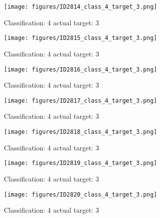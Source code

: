\begin{figure}[h!]
\begin{center}
\texttt{[image: figures/ID2814\_class\_4\_target\_3.png]}
\end{center}
\caption{ Classification: 4 actual target: 3}
\label{fig:ID2814_class_4_target_3}
\end{figure}
\begin{figure}[h!]
\begin{center}
\texttt{[image: figures/ID2815\_class\_4\_target\_3.png]}
\end{center}
\caption{ Classification: 4 actual target: 3}
\label{fig:ID2815_class_4_target_3}
\end{figure}
\begin{figure}[h!]
\begin{center}
\texttt{[image: figures/ID2816\_class\_4\_target\_3.png]}
\end{center}
\caption{ Classification: 4 actual target: 3}
\label{fig:ID2816_class_4_target_3}
\end{figure}
\begin{figure}[h!]
\begin{center}
\texttt{[image: figures/ID2817\_class\_4\_target\_3.png]}
\end{center}
\caption{ Classification: 4 actual target: 3}
\label{fig:ID2817_class_4_target_3}
\end{figure}
\begin{figure}[h!]
\begin{center}
\texttt{[image: figures/ID2818\_class\_4\_target\_3.png]}
\end{center}
\caption{ Classification: 4 actual target: 3}
\label{fig:ID2818_class_4_target_3}
\end{figure}
\begin{figure}[h!]
\begin{center}
\texttt{[image: figures/ID2819\_class\_4\_target\_3.png]}
\end{center}
\caption{ Classification: 4 actual target: 3}
\label{fig:ID2819_class_4_target_3}
\end{figure}
\begin{figure}[h!]
\begin{center}
\texttt{[image: figures/ID2820\_class\_4\_target\_3.png]}
\end{center}
\caption{ Classification: 4 actual target: 3}
\label{fig:ID2820_class_4_target_3}
\end{figure}

